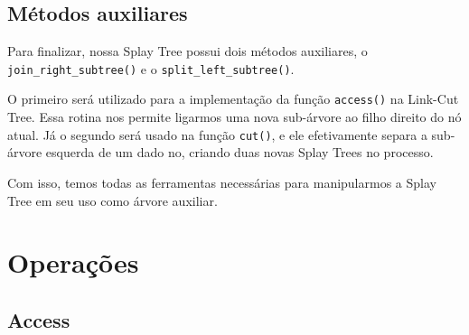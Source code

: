 \subsection{Métodos auxiliares}
\label{subsection:lct-splay-aux}

Para finalizar, nossa Splay Tree possui dois métodos auxiliares, o \texttt{join\_right\_subtree()} e o \texttt{split\_left\_subtree()}.

O primeiro será utilizado para a implementação da função \texttt{access()} na Link-Cut Tree. Essa rotina nos permite ligarmos uma nova sub-árvore ao filho direito do nó atual. Já o segundo será usado na função \texttt{cut()}, e ele efetivamente separa a sub-árvore esquerda de um dado no, criando duas novas Splay Trees no processo.

Com isso, temos todas as ferramentas necessárias para manipularmos a Splay Tree em seu uso como árvore auxiliar.

\section{Operações}
\label{sec:lct-operacoes}

\subsection{Access}
\label{subsection:lct-access}